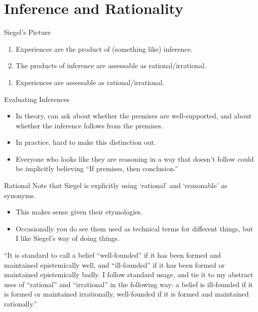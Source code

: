 \documentclass[
  17pt,
  letterpaper,
  ignorenonframetext,
  aspectratio=169,
  handout,
  xcolor={dvipsnames}]{beamer}
\providecommand{\tightlist}{%
  \setlength{\itemsep}{0pt}\setlength{\parskip}{0pt}}\usepackage{longtable,booktabs,array}
\begin{document}
\hypertarget{inference-and-rationality}{%
\section{Inference and Rationality}\label{inference-and-rationality}}

\begin{frame}{Siegel's Picture}
\protect\hypertarget{siegels-picture}{}
\begin{enumerate}[<+->]
\tightlist
\item
  Experiences are the product of (something like) inference.
\item
  The products of inference are assessable as rational/irrational.
\end{enumerate}

\begin{enumerate}[<+->]
[A.]
\setcounter{enumi}{2}
\tightlist
\item
  Experiences are assessable as rational/irrational.
\end{enumerate}
\end{frame}

\begin{frame}{Evaluating Inferences}
\protect\hypertarget{evaluating-inferences}{}
\begin{itemize}[<+->]
\tightlist
\item
  In theory, can ask about whether the premises are well-supported, and
  about whether the inference follows from the premises.
\item
  In practice, hard to make this distinction out.
\item
  Everyone who looks like they are reasoning in a way that doesn't
  follow could be implicitly believing ``If premises, then conclusion.''
\end{itemize}
\end{frame}

\begin{frame}{Rational}
\protect\hypertarget{rational}{}
Note that Siegel is explicitly using `rational' and `reasonable' as
synonyms.

\begin{itemize}[<+->]
\tightlist
\item
  This makes sense given their etymologies.
\item
  Occasionally you do see them used as technical terms for different
  things, but I like Siegel's way of doing things.
\end{itemize}

\end{frame} \begin{frame}[plain]

``It is standard to call a belief ``well-founded'' if it has been formed
and maintained epistemically well, and ``ill-founded'' if it has been
formed or maintained epistemically badly. I follow standard usage, and
tie it to my abstract uses of ``rational'' and ``irrational'' in the
following way: a belief is ill-founded if it is formed or maintained
irrationally, well-founded if it is formed and maintained rationally.''
\end{frame}
\end{document}
